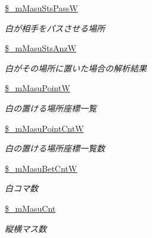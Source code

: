 \begin{DoxyCompactItemize}
\mbox{\label{class_reversi_a3a60b04cc5f54e1196feffc0ec12d89a}} 
\hyperlink{class_reversi_a3a60b04cc5f54e1196feffc0ec12d89a}{\$\+\_\+m\+Masu\+Sts\+PassW}
\begin{DoxyCompactList}\small\item\em 白が相手をパスさせる場所 \end{DoxyCompactList}\item 
\mbox{\label{class_reversi_a8654984ca1ca888a7e2b97e9a2d099aa}} 
\hyperlink{class_reversi_a8654984ca1ca888a7e2b97e9a2d099aa}{\$\+\_\+m\+Masu\+Sts\+AnzW}
\begin{DoxyCompactList}\small\item\em 白がその場所に置いた場合の解析結果 \end{DoxyCompactList}\item 
\mbox{\label{class_reversi_ac6007e0a7a850c31c37eb55ea74746a7}} 
\hyperlink{class_reversi_ac6007e0a7a850c31c37eb55ea74746a7}{\$\+\_\+m\+Masu\+PointW}
\begin{DoxyCompactList}\small\item\em 白の置ける場所座標一覧 \end{DoxyCompactList}\item 
\mbox{\label{class_reversi_aad5f6baed07b96cd5d06e38fd66f1c36}} 
\hyperlink{class_reversi_aad5f6baed07b96cd5d06e38fd66f1c36}{\$\+\_\+m\+Masu\+Point\+CntW}
\begin{DoxyCompactList}\small\item\em 白の置ける場所座標一覧数 \end{DoxyCompactList}\item 
\mbox{\label{class_reversi_a92a21ca9d4bad37593fea8b3d2be6981}} 
\hyperlink{class_reversi_a92a21ca9d4bad37593fea8b3d2be6981}{\$\+\_\+m\+Masu\+Bet\+CntW}
\begin{DoxyCompactList}\small\item\em 白コマ数 \end{DoxyCompactList}\item 
\mbox{\label{class_reversi_a8ac63bcef31cc4d29b244456c62677bc}} 
\hyperlink{class_reversi_a8ac63bcef31cc4d29b244456c62677bc}{\$\+\_\+m\+Masu\+Cnt}
\begin{DoxyCompactList}\small\item\em 縦横マス数 \end{DoxyCompactList}\item 

\end{DoxyCompactItemize}
